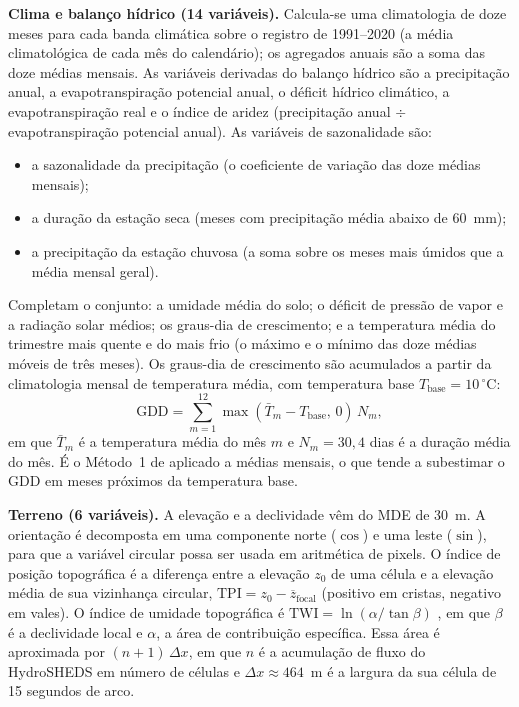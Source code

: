\textbf{Clima e balanço hídrico (14 variáveis).} Calcula-se uma climatologia de doze meses
para cada banda climática sobre o registro de 1991--2020 (a média climatológica de cada mês
do calendário); os agregados anuais são a soma das doze médias mensais. As variáveis
derivadas do balanço hídrico são a precipitação anual, a evapotranspiração potencial anual, o
déficit hídrico climático, a evapotranspiração real e o índice de aridez (precipitação anual
$\div$ evapotranspiração potencial anual). As variáveis de sazonalidade são:
\begin{itemize}
  \item a sazonalidade da precipitação (o coeficiente de variação das doze médias mensais);
  \item a duração da estação seca (meses com precipitação média abaixo de 60~mm);
  \item a precipitação da estação chuvosa (a soma sobre os meses mais úmidos que a média mensal geral).
\end{itemize}
Completam o conjunto: a umidade média do solo; o déficit de pressão de vapor e a radiação solar
médios; os graus-dia de crescimento; e a temperatura média do trimestre mais quente e do mais frio (o
máximo e o mínimo das doze médias móveis de três meses). Os graus-dia de crescimento são acumulados a
partir da climatologia mensal de temperatura média, com temperatura base
$T_{\text{base}} = 10\,^\circ\mathrm{C}$:
\begin{equation*}
  \mathrm{GDD} = \sum_{m=1}^{12} \max\!\left(\bar{T}_m - T_{\text{base}},\, 0\right)\, N_m,
\end{equation*}
em que $\bar{T}_m$ é a temperatura média do mês $m$ e $N_m = 30{,}4$ dias é a duração média do mês. É o
Método~1 de \citet[p.~292]{mcmaster_growing_1997} aplicado a médias mensais, o que tende a
subestimar o GDD em meses próximos da temperatura base.

\textbf{Terreno (6 variáveis).} A elevação e a declividade vêm do MDE de 30~m. A orientação é
decomposta em uma componente norte ($\cos$) e uma leste ($\sin$), para que a variável circular
possa ser usada em aritmética de pixels. O índice de posição topográfica é a diferença entre
a elevação $z_0$ de uma célula e a elevação média de sua vizinhança circular,
$\mathrm{TPI} = z_0 - \overline{z}_{\text{focal}}$ (positivo em cristas, negativo em vales). O
índice de umidade topográfica é $\mathrm{TWI} = \ln(\alpha / \tan\beta)$
\citep[p.~48, eq.~8]{beven_physically_1979}, em que $\beta$ é a declividade local e $\alpha$, a área
de contribuição específica. Essa área é aproximada por $(n+1)\,\Delta x$, em que $n$ é a acumulação
de fluxo do HydroSHEDS em número de células e $\Delta x \approx 464$~m é a largura da sua célula de
15 segundos de arco.

